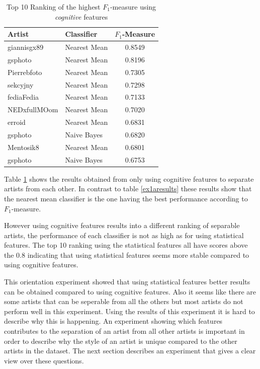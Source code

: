 \begin{table}
    \centering
    \begin{tabular}
        { | l | l | c |} 
        \hline
        Artist & Classifier & $F_1$-Measure \\
        \hline
        giannisgx89 & Nearest Mean & 0.8549 \\ 
        gsphoto & Nearest Mean & 0.8196 \\ 
        Pierrebfoto & Nearest Mean & 0.7305 \\ 
        sekcyjny & Nearest Mean & 0.7298 \\ 
        fediaFedia & Nearest Mean & 0.7133 \\
        NEDxfullMOom & Nearest Mean & 0.7020 \\
        erroid & Nearest Mean & 0.6831 \\
        gsphoto & Naive Bayes & 0.6820 \\
        Mentosik8 & Nearest Mean & 0.6801 \\
        gsphoto & Naive Bayes & 0.6753 \\
        \hline 
    \end{tabular}
    \caption{Top 10 Ranking of the highest $F_1$-measure using \textit{cognitive} features}
    \label{ex1bresults}
\end{table}

Table \ref{ex1bresults} shows the results obtained from only using cognitive features to separate artists from each other.
In contrast to table \ref{ex1aresults} these results show that the nearest mean classifier is the one having the best performance according to $F_1$-measure.

However using cognitive features results into a different ranking of separable artists, the performance of each classifier is not as high as for using statistical features.
The top 10 ranking using the statistical features all have scores above the 0.8 indicating that using statistical features seems more stable compared to using cognitive features.

This orientation experiment showed that using statistical features better results can be obtained compared to using cognitive features.
Also it seems like there are some artists that can be seperable from all the others but most artists do not perform well in this experiment.
Using the results of this experiment it is hard to describe why this is happening. 
An experiment showing which features contributes to the separation of an artist from all other artists is important in order to describe why the style of an artist is unique compared to the other artists in the dataset.
The next section describes an experiment that gives a clear view over these questions.

